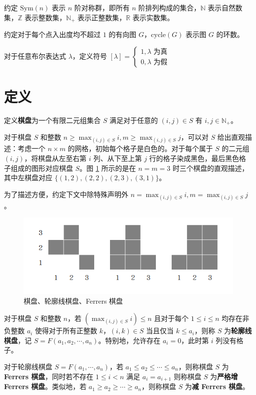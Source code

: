 \documentclass{noithesis}
\begin{document}
	约定 $\mathrm{Sym}(n)$ 表示 $n$ 阶对称群，即所有 $n$ 阶排列构成的集合，$\mathbb{N}$ 表示自然数集，$\mathbb{Z}$ 表示整数集，$\mathbb{N_+}$ 表示正整数集，$\mathbb{R}$ 表示实数集。
	
	约定对于每个点入出度均不超过 $1$ 的有向图 $G$，$\mathrm{cycle}(G)$ 表示图 $G$ 的环数。
	
	对于任意布尔表达式 $\lambda$，定义符号 $[\lambda] = \begin{cases} 1 , \lambda \text{ 为真} \\ 0 , \lambda\text{ 为假} \end{cases}$
	
	\section{定义}
	
	\begin{definition}[棋盘]
		定义\textbf{棋盘}为一个有限二元组集合 $S$ 满足对于任意的 $(i,j) \in S$ 有 $i,j \in \mathbb{N_+}$。
	\end{definition}
	
	对于棋盘 $S$ 和整数 $n \geq \max_{(i,j) \in S} i, m \geq \max_{(i,j) \in S} j$，可以对 $S$ 给出直观描述：考虑一个 $n \times m$ 的网格，初始每个格子是白色的。对于每个属于 $S$ 的二元组 $(i,j)$，将棋盘从左至右第 $i$ 列、从下至上第 $j$ 行的格子染成黑色，最后黑色格子组成的图形对应棋盘 $S$。图 \ref{f1} 所示的是在 $n=m=3$ 时三个棋盘的直观描述，其中左棋盘对应 $\{(1,2),(2,2),(2,3),(3,1)\}$。
	
	为了描述方便，约定下文中除特殊声明外 $n=\max_{(i,j) \in S} i , m = \max_{(i,j) \in S} j$。
	
	\begin{figure}[h]
	\centering
	\caption{棋盘、轮廓线棋盘、Ferrers 棋盘}
	\label{f1}
	\includegraphics[scale=0.6]{picture/figure1.png}
	\end{figure}
	
	\begin{definition}[轮廓线棋盘]
		对于棋盘 $S$ 和整数 $n$，若 $(\max_{(i,j) \in S} i) \leq n$ 且对于每个 $1 \leq i \leq n$ 均存在非负整数 $a_i$ 使得对于所有正整数 $k$，$(i,k) \in S$ 当且仅当 $k \leq a_i$，则称 $S$ 为\textbf{轮廓线棋盘}，记 $S = F(a_1,a_2,\cdots,a_n)$。特别地，允许存在 $a_i=0$，此时第 $i$ 列没有格子。
	\end{definition}
	\begin{definition}[Ferrers 棋盘]
		对于轮廓线棋盘 $S = F(a_1,\cdots,a_n)$，若 $a_1 \leq a_2 \leq \cdots \leq a_n$，则称棋盘 $S$ 为\textbf{Ferrers 棋盘}，同时若不存在 $1 \leq i < n$ 满足 $a_i = a_{i+1}$ 则称棋盘 $S$ 为\textbf{严格增 Ferrers 棋盘}。类似地，若 $a_1 \geq a_2 \geq \cdots \geq a_n$，则称棋盘 $S$ 为\textbf{减 Ferrers 棋盘}。
	\end{definition}
	
\end{document}
